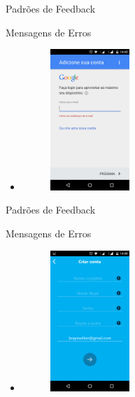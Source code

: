 \begin{frame}{Padrões de Feedback}
\begin{block}{Mensagens de Erros}
  \begin{itemize}
    \item<1-> \begin{figure}
    \includegraphics[width=3cm]{figuras/error/error3}
    \end{figure}
  \end{itemize}
\end{block}
\end{frame}

\begin{frame}{Padrões de Feedback}
\begin{block}{Mensagens de Erros}
  \begin{itemize}
    \item<1-> \begin{figure}
    \includegraphics[width=3cm]{figuras/error/error4}
    \end{figure}
  \end{itemize}
\end{block}
\end{frame}

